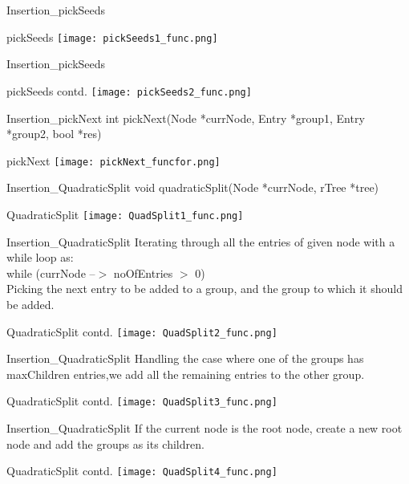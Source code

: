 \documentclass{beamer}
\begin{document}
\begin{frame}{Insertion_{pickSeeds}}
    \begin{block}{pickSeeds}
       \texttt{[image: pickSeeds1\_func.png]}
    \end{block}
\end{frame}
\begin{frame}{Insertion_{pickSeeds}}
    \begin{block}{pickSeeds contd.}
       \texttt{[image: pickSeeds2\_func.png]}
    \end{block}
\end{frame}
\begin{frame}{Insertion_{pickNext}}
int pickNext(Node *currNode, Entry *group1, Entry *group2, bool *res)
    \begin{block}{pickNext}
       \texttt{[image: pickNext\_funcfor.png]}
    \end{block}
\end{frame}
\begin{frame}{Insertion_{QuadraticSplit}}
void quadraticSplit(Node *currNode, rTree *tree)
    \begin{block}{QuadraticSplit}
       \texttt{[image: QuadSplit1\_func.png]}
    \end{block}
\end{frame}
\begin{frame}{Insertion_{QuadraticSplit}}
Iterating through all the entries of given node with a while loop as:\\
while (currNode --$>$ noOfEntries $>$ 0)\\
Picking the next entry to be added to a group, and the group to which it should be added.
    \begin{block}{QuadraticSplit contd.}
       \texttt{[image: QuadSplit2\_func.png]}
    \end{block}
\end{frame}
\begin{frame}{Insertion_{QuadraticSplit}}
Handling the case where one of the groups has maxChildren entries,we add all the remaining entries to the other group.
    \begin{block}{QuadraticSplit contd.}
       \texttt{[image: QuadSplit3\_func.png]}
    \end{block}
\end{frame}
\begin{frame}{Insertion_{QuadraticSplit}}
If the current node is the root node, create a new root node and add the groups as its children.
    \begin{block}{QuadraticSplit contd.}
       \texttt{[image: QuadSplit4\_func.png]}
    \end{block}
\end{frame}
\end{document}
